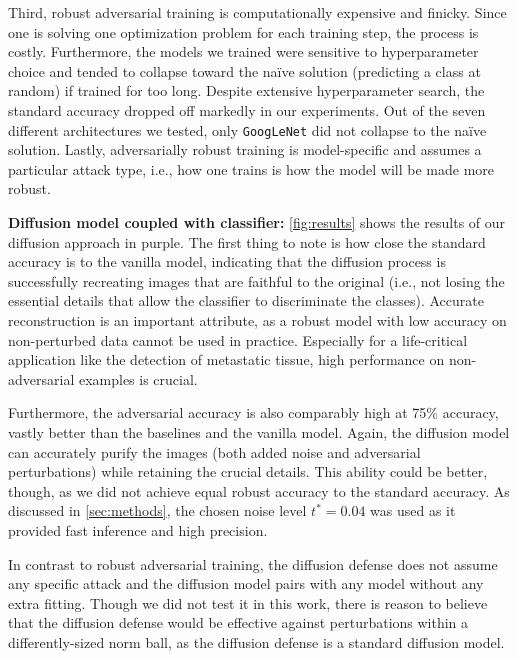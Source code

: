 \documentclass[twocolumn]{article}
\begin{document}
Third, robust adversarial training is computationally expensive and finicky. Since one is solving one optimization problem for each training step, the process is costly. Furthermore, the models we trained were sensitive to hyperparameter choice and tended to collapse toward the naïve solution (predicting a class at random) if trained for too long. Despite extensive hyperparameter search, the standard accuracy dropped off markedly in our experiments. Out of the seven different architectures we tested, only \texttt{GoogLeNet} did not collapse to the naïve solution. Lastly, adversarially robust training is model-specific and assumes a particular attack type, i.e., how one trains is how the model will be made more robust.


\textbf{Diffusion model coupled with classifier:}
\autoref{fig:results} shows the results of our diffusion approach in purple. The first thing to note is how close the standard accuracy is to the vanilla model, indicating that the diffusion process is successfully recreating images that are faithful to the original (i.e., not losing the essential details that allow the classifier to discriminate the classes). Accurate reconstruction is an important attribute, as a robust model with low accuracy on non-perturbed data cannot be used in practice. Especially for a life-critical application like the detection of metastatic tissue, high performance on non-adversarial examples is crucial.

Furthermore, the adversarial accuracy is also comparably high at 75\% accuracy, vastly better than the baselines and the vanilla model. Again, the diffusion model can accurately purify the images (both added noise and adversarial perturbations) while retaining the crucial details. This ability could be better, though, as we did not achieve equal robust accuracy to the standard accuracy. As discussed in \autoref{sec:methods}, the chosen noise level $t^*=0.04$ was used as it provided fast inference and high precision.

In contrast to robust adversarial training, the diffusion defense does not assume any specific attack and the diffusion model pairs with any model without any extra fitting. Though we did not test it in this work, there is reason to believe that the diffusion defense would be effective against perturbations within a differently-sized norm ball, as the diffusion defense is a standard diffusion model.
\end{document}
